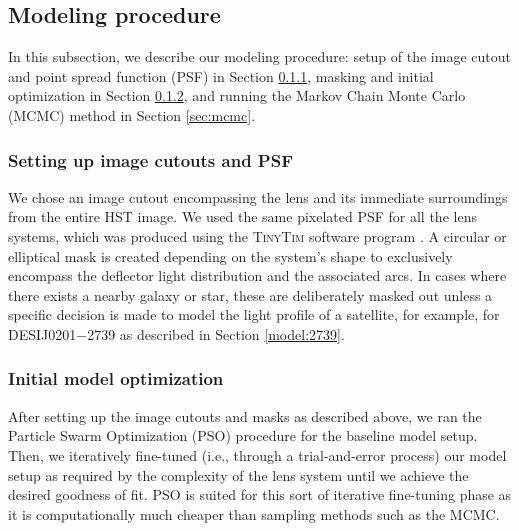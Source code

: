 \documentclass{aa}
\begin{document}
\subsection{Modeling procedure}

\label{modeling_procedure}
In this subsection, we describe our modeling procedure: setup of the image cutout and point spread function (PSF) in Section \ref{sec:PSF}, masking and initial optimization in Section \ref{sec:optimization}, and running the Markov Chain Monte Carlo (MCMC) method in Section \ref{sec:mcmc}.


\subsubsection{Setting up image cutouts and PSF}\label{sec:PSF}
We chose an image cutout encompassing the lens and its immediate surroundings from the entire HST image. We used the same pixelated PSF for all the lens systems, which was produced using the \textsc{TinyTim} software program \citep{Krist11}. A circular or elliptical mask is created depending on the system's shape to exclusively encompass the deflector light distribution and the associated arcs.
In cases where there exists a nearby galaxy or star, these are deliberately masked out unless a specific decision is made to model the light profile of a satellite, for example, for DESIJ0201$-$2739 as described in Section \ref{model:2739}.

\subsubsection{Initial model optimization}\label{sec:optimization}

After setting up the image cutouts and masks as described above, we ran the Particle Swarm Optimization (PSO) procedure for the baseline model setup. Then, we iteratively fine-tuned (i.e., through a trial-and-error process) our model setup as required by the complexity of the lens system until we achieve the desired goodness of fit. PSO is suited for this sort of iterative fine-tuning phase as it is computationally much cheaper than sampling methods such as the MCMC. %
 
\end{document}
